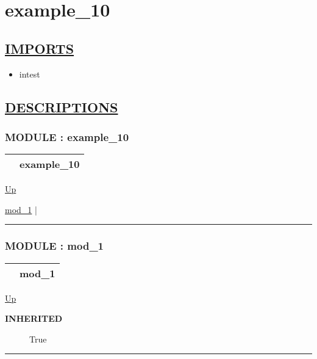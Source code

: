 \chapter*{example\_10}
\hypertarget{ecldoc:toc:example_10}{}

\section*{\underline{IMPORTS}}
\begin{itemize}
\item intest
\end{itemize}

\section*{\underline{DESCRIPTIONS}}
\subsection*{MODULE : example\_10}
\hypertarget{ecldoc:example_10}{}

{\renewcommand{\arraystretch}{1.5}
\begin{tabularx}{\textwidth}{|>{\raggedright\arraybackslash}l|X|}
\hline
\hspace{0pt} & example\_10 \\
\hline
\end{tabularx}
}

\hyperlink{ecldoc:toc:root}{Up}

\par


\hyperlink{ecldoc:intest.Example_3.mod_1}{mod\_1}  |

\rule{\textwidth}{0.4pt}

\subsection*{MODULE : mod\_1}
\hypertarget{ecldoc:intest.Example_3.mod_1}{}

{\renewcommand{\arraystretch}{1.5}
\begin{tabularx}{\textwidth}{|>{\raggedright\arraybackslash}l|X|}
\hline
\hspace{0pt} & mod\_1 \\
\hline
\end{tabularx}
}

\hyperlink{ecldoc:example_10}{Up}

\par

\par
\begin{description}
\item [\textbf{INHERITED}] True
\end{description}

\rule{\textwidth}{0.4pt}


